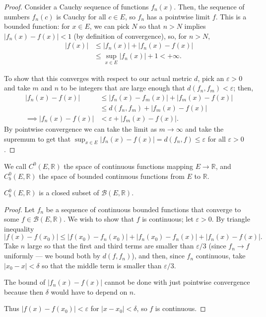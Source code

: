 \documentclass[10pt]{scrartcl}
\providecommand{\eps}{\varepsilon}
\providecommand{\RR}{\mathbb R}
\begin{document}
\begin{proof}
	Consider a Cauchy sequence of functions $f_n(x)$.
	Then, the sequence of numbers $f_n(c)$ is Cauchy for all $c\in E$,
	so $f_n$ has a pointwise limit $f$.
	This is a bounded function: for $x\in E$,
	we can pick $N$ so that $n > N$ implies $|f_n(x) - f(x)| < 1$
	(by definition of convergence), so, for $n > N$,
	\begin{align*}
		|f(x)| &\le |f_n(x)| + |f_n(x) - f(x)|\\
		&\le \sup_{x\in E} |f_n(x)| + 1 < +\infty.
	\end{align*}

	To show that this converges with respect to our actual metric $d$,
	pick an $\eps > 0$ and take $m$ and $n$ to be integers that are large enough
	that $d(f_n, f_m) < \eps$; then,
	\begin{align*}
		|f_n(x) - f(x)| &\le |f_n(x) - f_m(x)| + |f_m(x) - f(x)|\\
		&\le d(f_n, f_m) + |f_m(x) - f(x)|\\
		\implies |f_n(x) - f(x)| &< \eps + |f_m(x) - f(x)|.
	\end{align*}
	By pointwise convergence we can take the limit as $m\to\infty$
	and take the supremum to get that
	$\sup_{x\in E}|f_n(x) - f(x)| = d(f_n, f) \le\eps$ for all $\eps > 0$.
\end{proof}

\begin{definition}
	We call $C^0(E, \RR)$ the space of continuous functions
	mapping $E\to\RR$,
	and $C^0_b(E,\RR)$ the space of bounded continuous functions
	from $E$ to $\RR$.
\end{definition}

\begin{theorem}\label{wk10:thm:bounded-cont-funcs-closed}
	$C^0_b(E,\RR)$ is a closed subset of $\mathcal B(E,\RR)$.
\end{theorem}

\begin{proof}
	Let $f_n$ be a sequence of continuous bounded functions
	that converge to some $f\in\mathcal B(E,\RR)$.
	We wish to show that $f$ is continuous; let $\eps > 0$.
	By triangle inequality
	\[|f(x) - f(x_0)| \le
	|f(x_0) - f_n(x_0)| + |f_n(x_0) - f_n(x)| + |f_n(x) - f(x)|.\]
	Take $n$ large so that the first and third terms are smaller than $\eps/3$
	(since $f_n\to f$ uniformly --- we bound both by $d(f, f_n)$),
	and then, since $f_n$ continuous, take $|x_0 - x| < \delta$
	so that the middle term is smaller than $\eps/3$.
	\begin{remark}
		The bound of $|f_n(x) - f(x)|$ cannot be done with
		just pointwise convergence because then
		$\delta$ would have to depend on $n$.
	\end{remark}
	Thus $|f(x) - f(x_0)| < \eps$ for $|x - x_0| < \delta$,
	so $f$ is continuous.
\end{proof}
\end{document}
